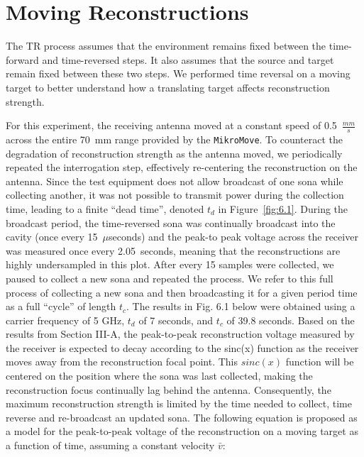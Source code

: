 \chapter{Moving Reconstructions}

\label{ch:moving}

The TR process assumes that the environment remains fixed between the time-forward and time-reversed steps. It also assumes that the source and target remain fixed between these two steps. We performed time reversal on a moving target to better understand how a translating target affects reconstruction strength.

For this experiment, the receiving antenna moved at a constant speed of 0.5~$\frac{mm}{s}$ across the entire 70~mm range provided by the \texttt{MikroMove}. To counteract the degradation of reconstruction strength as the antenna moved, we periodically repeated the interrogation step, effectively re-centering the reconstruction on the antenna. Since the test equipment does not allow broadcast of one sona while collecting another, it was not possible to transmit power during the collection time, leading to a finite ``dead time'', denoted $t_d$ in Figure~\ref{fig:6.1}. During the broadcast period, the time-reversed sona was continually broadcast into the cavity (once every 15~$\mu$seconds) and the peak-to peak voltage across the receiver was measured once every 2.05~seconds, meaning that the reconstructions are highly undersampled in this plot. After every 15 samples were collected, we paused to collect a new sona and repeated the process. We refer to this full process of collecting a new sona and then broadcasting it for a given period time as a full ``cycle'' of length $t_c$. The results in Fig. 6.1 below were obtained using a carrier frequency of 5 GHz, $t_d$ of 7 seconds, and $t_c$ of 39.8 seconds. Based on the results from Section III-A, the peak-to-peak reconstruction voltage measured by the receiver is expected to decay according to the sinc(x) function as the receiver
moves away from the reconstruction focal point. This $sinc(x)$ function will be centered on the position where the sona was last collected, making the reconstruction focus continually lag behind the antenna. Consequently, the maximum reconstruction strength is limited by the time needed to collect, time reverse and re-broadcast an updated sona. The following equation is proposed as a model for the peak-to-peak voltage of the reconstruction on a moving target as a
function of time, assuming a constant velocity $\bar{v}$:

